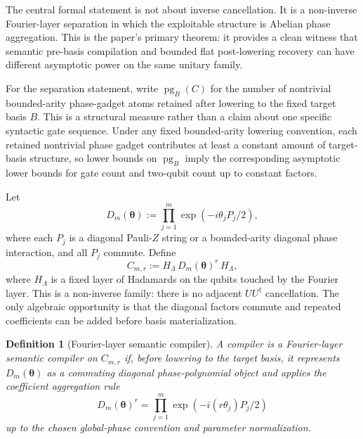 \documentclass[11pt]{article}
\newtheorem{definition}{Definition}
\begin{document}
The central formal statement is not about inverse cancellation. It is a
non-inverse Fourier-layer separation in which the exploitable structure is
Abelian phase aggregation. This is the paper's primary theorem: it provides a
clean witness that semantic pre-basis compilation and bounded flat
post-lowering recovery can have different asymptotic power on the same unitary
family.

For the separation statement, write $\operatorname{pg}_B(C)$ for the number of
nontrivial bounded-arity phase-gadget atoms retained after lowering to the
fixed target basis $B$. This is a structural measure rather than a claim about
one specific syntactic gate sequence. Under any fixed bounded-arity lowering
convention, each retained nontrivial phase gadget contributes at least a
constant amount of target-basis structure, so lower bounds on
$\operatorname{pg}_B$ imply the corresponding asymptotic lower bounds for gate
count and two-qubit count up to constant factors.

Let
\[
D_m(\boldsymbol{\theta})
:=
\prod_{j=1}^{m} \exp\!\left(-i\theta_j P_j/2\right),
\]
where each $P_j$ is a diagonal Pauli-$Z$ string or a bounded-arity diagonal
phase interaction, and all $P_j$ commute. Define
\[
C_{m,r}
:=
H_{\Lambda}\,D_m(\boldsymbol{\theta})^r\,H_{\Lambda},
\]
where $H_{\Lambda}$ is a fixed layer of Hadamards on the qubits touched by the
Fourier layer. This is a non-inverse family: there is no adjacent
$U U^\dagger$ cancellation. The only algebraic opportunity is that the
diagonal factors commute and repeated coefficients can be added before basis
materialization.

\begin{definition}[Fourier-layer semantic compiler]
A compiler is a \emph{Fourier-layer semantic compiler} on $C_{m,r}$ if, before
lowering to the target basis, it represents $D_m(\boldsymbol{\theta})$ as a
commuting diagonal phase-polynomial object and applies the coefficient
aggregation rule
\[
D_m(\boldsymbol{\theta})^r
=
\prod_{j=1}^{m}
\exp\!\left(-i(r\theta_j)P_j/2\right)
\]
up to the chosen global-phase convention and parameter normalization.
\end{definition}
\end{document}
